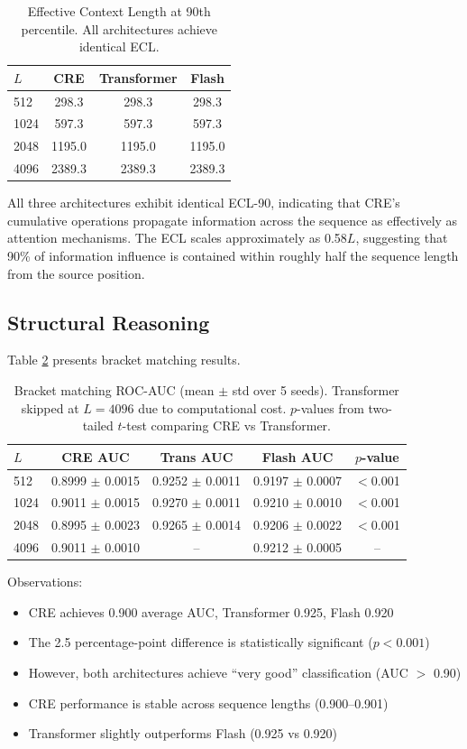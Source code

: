 \documentclass{article}
\begin{document}
\begin{table}[h]
\centering
\begin{tabular}{lccc}
\toprule
$L$ & CRE & Transformer & Flash \\
\midrule
512 & 298.3 & 298.3 & 298.3 \\
1024 & 597.3 & 597.3 & 597.3 \\
2048 & 1195.0 & 1195.0 & 1195.0 \\
4096 & 2389.3 & 2389.3 & 2389.3 \\
\bottomrule
\end{tabular}
\caption{Effective Context Length at 90th percentile. All architectures achieve identical ECL.}
\label{tab:ecl}
\end{table}

All three architectures exhibit identical ECL-90, indicating that CRE's cumulative operations propagate information across the sequence as effectively as attention mechanisms. The ECL scales approximately as 0.58$L$, suggesting that 90\% of information influence is contained within roughly half the sequence length from the source position.

\subsection{Structural Reasoning}

Table \ref{tab:bracket} presents bracket matching results.

\begin{table}[h]
\centering
\begin{tabular}{lcccc}
\toprule
$L$ & CRE AUC & Trans AUC & Flash AUC & $p$-value \\
\midrule
512 & 0.8999 $\pm$ 0.0015 & 0.9252 $\pm$ 0.0011 & 0.9197 $\pm$ 0.0007 & $<$0.001 \\
1024 & 0.9011 $\pm$ 0.0015 & 0.9270 $\pm$ 0.0011 & 0.9210 $\pm$ 0.0010 & $<$0.001 \\
2048 & 0.8995 $\pm$ 0.0023 & 0.9265 $\pm$ 0.0014 & 0.9206 $\pm$ 0.0022 & $<$0.001 \\
4096 & 0.9011 $\pm$ 0.0010 & -- & 0.9212 $\pm$ 0.0005 & -- \\
\bottomrule
\end{tabular}
\caption{Bracket matching ROC-AUC (mean $\pm$ std over 5 seeds). Transformer skipped at $L=4096$ due to computational cost. $p$-values from two-tailed $t$-test comparing CRE vs Transformer.}
\label{tab:bracket}
\end{table}

Observations:
\begin{itemize}
\item CRE achieves 0.900 average AUC, Transformer 0.925, Flash 0.920
\item The 2.5 percentage-point difference is statistically significant ($p < 0.001$)
\item However, both architectures achieve ``very good'' classification (AUC $>$ 0.90)
\item CRE performance is stable across sequence lengths (0.900--0.901)
\item Transformer slightly outperforms Flash (0.925 vs 0.920)
\end{itemize}
\end{document}
